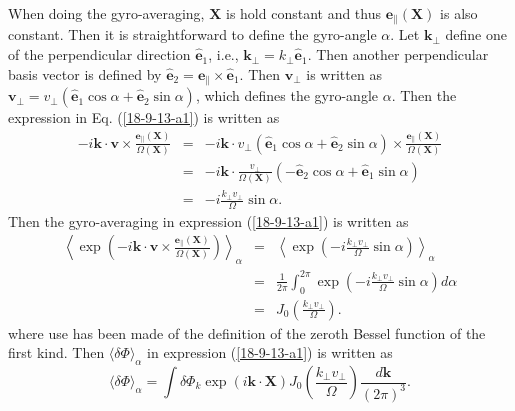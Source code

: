 \documentclass{article}
\begin{document}
When doing the gyro-averaging, $\mathbf{X}$ is hold constant and thus
$\mathbf{e}_{\parallel} (\mathbf{X})$ is also constant. Then it is
straightforward to define the gyro-angle $\alpha$. Let $\mathbf{k}_{\perp}$
define one of the perpendicular direction $\hat{\mathbf{e}}_1$, i.e.,
$\mathbf{k}_{\perp} = k_{\perp} \hat{\mathbf{e}}_1$. Then another
perpendicular basis vector is defined by $\hat{\mathbf{e}}_2
=\mathbf{e}_{\parallel} \times \hat{\mathbf{e}}_1$. Then $\mathbf{v}_{\perp}$
is written as $\mathbf{v}_{\perp} = v_{\perp} (\hat{\mathbf{e}}_1 \cos \alpha
+ \hat{\mathbf{e}}_2 \sin \alpha)$, which defines the gyro-angle $\alpha$.
Then the expression in Eq. (\ref{18-9-13-a1}) is written as
\begin{eqnarray}
  - i\mathbf{k} \cdot \mathbf{v} \times \frac{\mathbf{e}_{\parallel}
  (\mathbf{X})}{\Omega (\mathbf{X})} & = & - i\mathbf{k} \cdot v_{\perp}
  (\hat{\mathbf{e}}_1 \cos \alpha + \hat{\mathbf{e}}_2 \sin \alpha) \times
  \frac{\mathbf{e}_{\parallel} (\mathbf{X})}{\Omega (\mathbf{X})} \nonumber\\
  & = & - i\mathbf{k} \cdot \frac{v_{\perp}}{\Omega (\mathbf{X})} (-
  \hat{\mathbf{e}}_2 \cos \alpha + \hat{\mathbf{e}}_1 \sin \alpha) \nonumber\\
  & = & - i \frac{k_{\perp} v_{\perp}}{\Omega} \sin \alpha . 
  \label{18-9-12-e6}
\end{eqnarray}
Then the gyro-averaging in expression (\ref{18-9-13-a1}) is written as
\begin{eqnarray}
  \left\langle \exp \left( - i\mathbf{k} \cdot \mathbf{v} \times
  \frac{\mathbf{e}_{\parallel} (\mathbf{X})}{\Omega (\mathbf{X})} \right)
  \right\rangle_{\alpha} & = & \left\langle \exp \left( - i \frac{k_{\perp}
  v_{\perp}}{\Omega} \sin \alpha \right) \right\rangle_{\alpha} \nonumber\\
  & = & \frac{1}{2 \pi} \int_0^{2 \pi} \exp \left( - i \frac{k_{\perp}
  v_{\perp}}{\Omega} \sin \alpha \right) d \alpha \nonumber\\
  & = & J_0 \left( \frac{k_{\perp} v_{\perp}}{\Omega} \right) . 
\end{eqnarray}
where use has been made of the definition of the zeroth Bessel function of the
first kind. Then $\langle \delta \Phi \rangle_{\alpha}$ in expression
(\ref{18-9-13-a1}) is written as
\begin{equation}
  \label{18-9-12-e1} \langle \delta \Phi \rangle_{\alpha} = \int \delta \Phi_k
  \exp (i\mathbf{k} \cdot \mathbf{X}) J_0 \left( \frac{k_{\perp}
  v_{\perp}}{\Omega} \right) \frac{d\mathbf{k}}{(2 \pi)^3} .
\end{equation}
\end{document}
